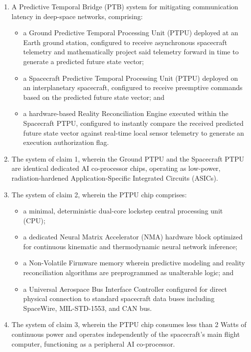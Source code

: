 \documentclass[12pt,a4paper]{article}
\begin{document}
\begin{enumerate}
    \item A Predictive Temporal Bridge (PTB) system for mitigating communication latency in deep-space networks, comprising:
    \begin{itemize}
        \item a Ground Predictive Temporal Processing Unit (PTPU) deployed at an Earth ground station, configured to receive asynchronous spacecraft telemetry and mathematically project said telemetry forward in time to generate a predicted future state vector;
        \item a Spacecraft Predictive Temporal Processing Unit (PTPU) deployed on an interplanetary spacecraft, configured to receive preemptive commands based on the predicted future state vector; and
        \item a hardware-based Reality Reconciliation Engine executed within the Spacecraft PTPU, configured to instantly compare the received predicted future state vector against real-time local sensor telemetry to generate an execution authorization flag.
    \end{itemize}

    \item The system of claim 1, wherein the Ground PTPU and the Spacecraft PTPU are identical dedicated AI co-processor chips, operating as low-power, radiation-hardened Application-Specific Integrated Circuits (ASICs).

    \item The system of claim 2, wherein the PTPU chip comprises:
    \begin{itemize}
        \item a minimal, deterministic dual-core lockstep central processing unit (CPU);
        \item a dedicated Neural Matrix Accelerator (NMA) hardware block optimized for continuous kinematic and thermodynamic neural network inference;
        \item a Non-Volatile Firmware memory wherein predictive modeling and reality reconciliation algorithms are preprogrammed as unalterable logic; and
        \item a Universal Aerospace Bus Interface Controller configured for direct physical connection to standard spacecraft data buses including SpaceWire, MIL-STD-1553, and CAN bus.
    \end{itemize}

    \item The system of claim 3, wherein the PTPU chip consumes less than 2 Watts of continuous power and operates independently of the spacecraft's main flight computer, functioning as a peripheral AI co-processor.


\end{enumerate}
\end{document}
